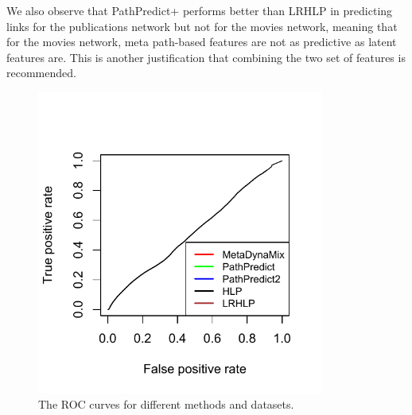 We also observe that PathPredict+ performs better than LRHLP in predicting links for the publications network but not for the movies network, meaning that for the movies network, meta path-based features are not as predictive as latent features are. This is another justification that combining the two set of features is recommended.




\begin{figure}[t]
\centering
\includegraphics[trim = 0mm 10mm 0mm 0mm,width=0.84\textwidth]{figs/ROC.pdf}
\caption{The ROC curves for different methods and datasets.} \label{fig:auc}
\end{figure}




